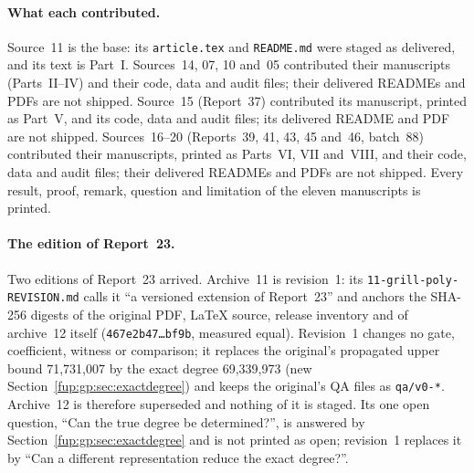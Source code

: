 \documentclass[11pt,letterpaper]{article}
\theoremstyle{definition}\newtheorem{definition}[theorem]{Definition}
\theoremstyle{remark}\newtheorem{remark}[theorem]{Remark}
\newcommand{\rw}[1]{\nolinkurl{#1}}%
\begin{document}
\paragraph{What each contributed.} Source~11 is the base: its \rw{article.tex} and \rw{README.md} were staged as delivered, and its text is Part~I. Sources~14, 07, 10 and~05 contributed their manuscripts (Parts~II--IV) and their code, data and audit files; their delivered READMEs and PDFs are not shipped. Source~15 (Report~37) contributed its manuscript, printed as Part~V, and its code, data and audit files; its delivered README and PDF are not shipped. Sources~16--20 (Reports~39, 41, 43, 45 and~46, batch~88) contributed their manuscripts, printed as Parts~VI, VII and~VIII, and their code, data and audit files; their delivered READMEs and PDFs are not shipped. Every result, proof, remark, question and limitation of the eleven manuscripts is printed.

\paragraph{The edition of Report~23.} Two editions of Report~23 arrived. Archive~11 is revision~1: its \rw{11-grill-poly-REVISION.md} calls it ``a versioned extension of Report~23'' and anchors the SHA-256 digests of the original PDF, LaTeX source, release inventory and of archive~12 itself (\texttt{467e2b47\ldots bf9b}, measured equal). Revision~1 changes no gate, coefficient, witness or comparison; it replaces the original's propagated upper bound 71,731,007 by the exact degree 69,339,973 (new Section~\ref{fup:gp:sec:exactdegree}) and keeps the original's QA files as \rw{qa/v0-*}. Archive~12 is therefore superseded and nothing of it is staged. Its one open question, ``Can the true degree be determined?'', is answered by Section~\ref{fup:gp:sec:exactdegree} and is not printed as open; revision~1 replaces it by ``Can a different representation reduce the exact degree?''.
\end{document}
